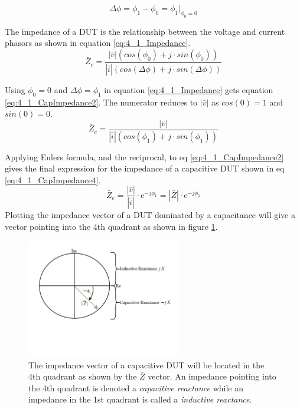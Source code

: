 \begin{equation}\label{eq:4_1_CapPhase}
    \Delta \phi = \phi_1 - \phi_0=\phi_1 \bigg\rvert_{\phi_0 = 0}
\end{equation}

The impedance of a DUT is the relationship between the voltage and current phasors as shown in equation \ref{eq:4_1_Impedance}.
\begin{equation}\label{eq:4_1_Impedance}
    \bar Z_c = \frac{|\bar v| (cos(\phi_0) +j\cdot sin(\phi_0))}{|\bar i| (cos(\Delta \phi) +j\cdot sin(\Delta \phi))}
\end{equation}

Using $\phi_0 = 0$ and $\Delta \phi = \phi_1$ in equation \ref{eq:4_1_Impedance} gets equation \ref{eq:4_1_CapImpedance2}. The numerator reduces to $|\bar v|$ as $cos(0) =1$ and $sin(0) = 0$.
\begin{equation}\label{eq:4_1_CapImpedance2}
    \bar Z_c = \frac{|\bar v|}{|\bar i| (cos(\phi_1) +j\cdot sin(\phi_1))}
\end{equation}

Applying Eulers formula, and the reciprocal, to eq \ref{eq:4_1_CapImpedance2} gives the final expression for the impedance of a capacitive DUT shown in eq \ref{eq:4_1_CapImpedance4}.
\begin{equation}\label{eq:4_1_CapImpedance4}
    \bar Z_c = \frac{|\bar v|}{|\bar i|} \cdot \mathrm e^{-j\phi_1} = |\bar Z| \cdot \mathrm e^{-j\phi_1} 
\end{equation}
Plotting the impedance vector of a DUT dominated by a capacitance will give a vector pointing into the 4th quadrant as shown in figure \ref{fig:4_1_CapImpedance}.
\begin{figure}[H]
    \centering
    \includegraphics[clip, trim=0 175 0 0, width=0.60\textwidth]{Sections/4_TechnicalAnalysis/Figures/4_1_CapImpedance.pdf}
    \caption{The impedance vector of a capacitive DUT will be located in the 4th quadrant as shown by the $\bar Z$ vector. An impedance pointing into the 4th quadrant is denoted a \textit{capacitive reactance} while an impedance in the 1st quadrant is called a \textit{inductive reactance}.}
    \label{fig:4_1_CapImpedance}
\end{figure}

